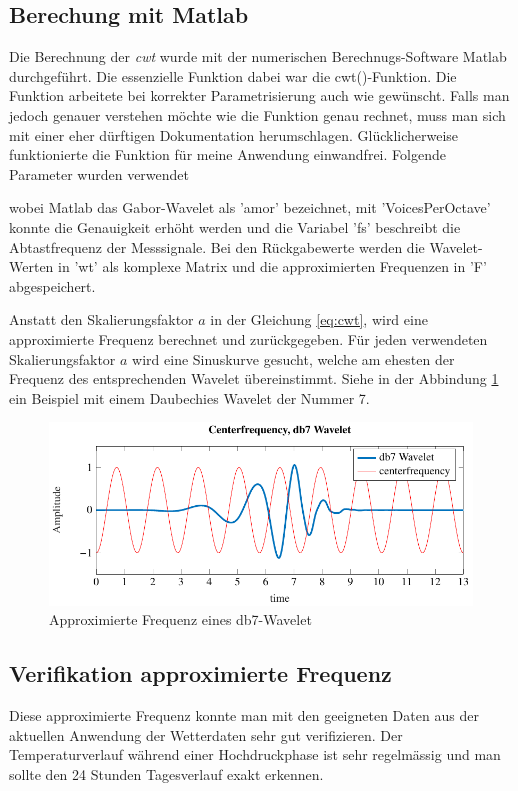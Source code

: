 \begin{refsection}
\subsection{Berechung mit Matlab}
Die Berechnung der \textit{cwt} wurde mit der numerischen Berechnugs-Software Matlab durchgeführt.
Die essenzielle Funktion dabei war die cwt()-Funktion.
Die Funktion arbeitete bei korrekter Parametrisierung auch wie gewünscht.
Falls man jedoch genauer verstehen möchte wie die Funktion genau rechnet, muss man sich mit einer eher dürftigen Dokumentation herumschlagen.
Glücklicherweise funktionierte die Funktion für meine Anwendung einwandfrei.
Folgende Parameter wurden verwendet

\label{fig:matlab_code_cwt}
wobei Matlab das Gabor-Wavelet als 'amor' bezeichnet, mit 'VoicesPerOctave' konnte die Genauigkeit erhöht werden und die Variabel 'fs' beschreibt die Abtastfrequenz der Messsignale.
Bei den Rückgabewerte werden die Wavelet-Werten in 'wt' als komplexe Matrix und die approximierten Frequenzen in 'F' abgespeichert.

Anstatt den Skalierungsfaktor $a$ in der Gleichung \ref{eq:cwt}, wird eine approximierte Frequenz berechnet und zurückgegeben.
Für jeden verwendeten Skalierungsfaktor $a$ wird eine Sinuskurve gesucht, welche am ehesten der Frequenz des entsprechenden Wavelet übereinstimmt.
Siehe in der Abbindung \ref{fig:centerf} ein Beispiel mit einem Daubechies Wavelet der Nummer 7.
\begin{figure}
	\centering
	\includegraphics[width=1\textwidth]{papers/wwt/images/centerf.pdf}
	\caption{Approximierte Frequenz eines db7-Wavelet}
	\label{fig:centerf}
\end{figure}


\newpage
\subsection{Verifikation approximierte Frequenz}
Diese approximierte Frequenz konnte man mit den geeigneten Daten aus der aktuellen Anwendung der Wetterdaten sehr gut verifizieren.
Der Temperaturverlauf während einer Hochdruckphase ist sehr regelmässig und man sollte den 24 Stunden Tagesverlauf exakt erkennen.


\end{refsection}
